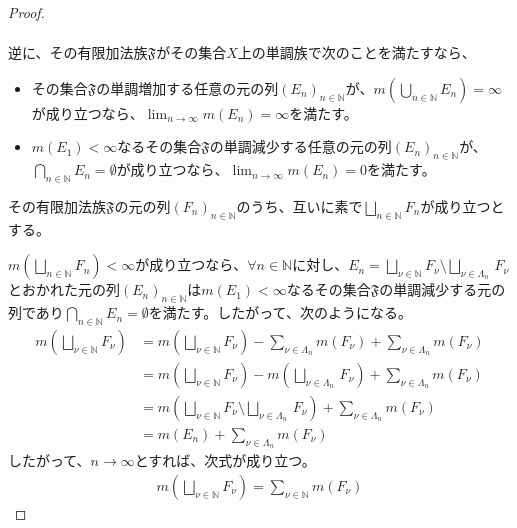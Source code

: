 \documentclass[dvipdfmx]{jsarticle}
\begin{document}
\begin{proof}
\begin{align*}
\end{align*}\par
逆に、その有限加法族$\mathfrak{F}$がその集合$X$上の単調族で次のことを満たすなら、
\begin{itemize}
\item
  その集合$\mathfrak{F}$の単調増加する任意の元の列$\left( E_{n} \right)_{n \in \mathbb{N}}$が、$m\left( \bigcup_{n \in \mathbb{N}} E_{n} \right) = \infty$が成り立つなら、$\lim_{n \rightarrow \infty}{m\left( E_{n} \right)} = \infty$を満たす。
\item
  $m\left( E_{1} \right) < \infty$なるその集合$\mathfrak{F}$の単調減少する任意の元の列$\left( E_{n} \right)_{n \in \mathbb{N}}$が、$\bigcap_{n \in \mathbb{N}} E_{n} = \emptyset$が成り立つなら、$\lim_{n \rightarrow \infty}{m\left( E_{n} \right)} = 0$を満たす。
\end{itemize}
その有限加法族$\mathfrak{F}$の元の列$\left( F_{n} \right)_{n \in \mathbb{N}}$のうち、互いに素で$\bigsqcup_{n \in \mathbb{N}} F_{n}$が成り立つとする。\par
$m\left( \bigsqcup_{n \in \mathbb{N}} F_{n} \right) < \infty$が成り立つなら、$\forall n \in \mathbb{N}$に対し、$E_{n} = \bigsqcup_{\nu \in \mathbb{N}} F_{\nu} \setminus \bigsqcup_{\nu \in \varLambda_{n}\mathbf{\ }} F_{\nu}$とおかれた元の列$\left( E_{n} \right)_{n \in \mathbb{N}}$は$m\left( E_{1} \right) < \infty$なるその集合$\mathfrak{F}$の単調減少する元の列であり$\bigcap_{n \in \mathbb{N}} E_{n} = \emptyset$を満たす。したがって、次のようになる。
\begin{align*}
m\left( \bigsqcup_{\nu \in \mathbb{N}} F_{\nu} \right) &= m\left( \bigsqcup_{\nu \in \mathbb{N}} F_{\nu} \right) - \sum_{\nu \in \varLambda_{n}} {m\left( F_{\nu} \right)} + \sum_{\nu \in \varLambda_{n}} {m\left( F_{\nu} \right)}\\
&= m\left( \bigsqcup_{\nu \in \mathbb{N}} F_{\nu} \right) - m\left( \bigsqcup_{\nu \in \varLambda_{n}\mathbf{\ }} F_{\nu} \right) + \sum_{\nu \in \varLambda_{n}} {m\left( F_{\nu} \right)}\\
&= m\left( \bigsqcup_{\nu \in \mathbb{N}} F_{\nu} \setminus \bigsqcup_{\nu \in \varLambda_{n}\mathbf{\ }} F_{\nu} \right) + \sum_{\nu \in \varLambda_{n}} {m\left( F_{\nu} \right)}\\
&= m\left( E_{n} \right) + \sum_{\nu \in \varLambda_{n}} {m\left( F_{\nu} \right)}
\end{align*}
したがって、$n \rightarrow \infty$とすれば、次式が成り立つ。
\begin{align*}
m\left( \bigsqcup_{\nu \in \mathbb{N}} F_{\nu} \right) = \sum_{\nu \in \mathbb{N}} {m\left( F_{\nu} \right)}

\end{align*}
\end{proof}
\end{document}
